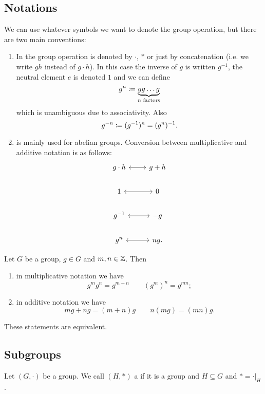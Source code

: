 \subsection{Notations}
We can use whatever symbols we want to denote the group operation, but there are two main conventions:
\begin{enumerate}
\item In  the group operation is denoted by $\boldsymbol{\cdot}$, $*$ or just by concatenation (i.e. we write $gh$ instead of $g\cdot h$). In this case the inverse of $g$ is written $g^{-1}$, the neutral element $e$ is denoted $1$ and we can define
\[ g^n \coloneqq \underbrace{gg\ldots g}_{\text{$n$ factors}}\]
which is unambiguous due to associativity. Also
\[ g^{-n} \coloneqq (g^{-1})^n = (g^{n})^{-1}. \]
\item {} is mainly used for abelian groups. Conversion between multiplicative and additive notation is as follows:
\[ \begin{tikzcd}
g\cdot h \arrow[r, leftrightarrow]& g+h \\
1 \arrow[r, leftrightarrow]& 0 \\
g^{-1} \arrow[r, leftrightarrow]& -g \\
g^n \arrow[r, leftrightarrow] & ng.
\end{tikzcd} \]
\end{enumerate}

\begin{lemma} \label{lemma:calculusRepeatedGroupOperation}
Let $G$ be a group, $g\in G$ and $m,n\in \mathbb{Z}$. Then
\begin{enumerate}
\item in multiplicative notation we have
\[ g^mg^n = g^{m+n} \qquad (g^m)^n = g^{mn}; \]
\item in additive notation we have
\[ mg+ng = (m+n)g \qquad n(mg) = (mn)g. \]
\end{enumerate}
These statements are equivalent.
\end{lemma}

\subsection{Subgroups}
\begin{definition}
Let $(G,\boldsymbol{\cdot})$ be a group. We call $(H,*)$ a  if it is a group and $H\subseteq G$ and $* = \boldsymbol{\cdot}|_H$.
\end{definition}

